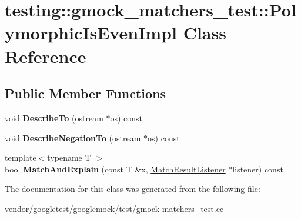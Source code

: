 \hypertarget{classtesting_1_1gmock__matchers__test_1_1_polymorphic_is_even_impl}{}\section{testing\+:\+:gmock\+\_\+matchers\+\_\+test\+:\+:Polymorphic\+Is\+Even\+Impl Class Reference}
\label{classtesting_1_1gmock__matchers__test_1_1_polymorphic_is_even_impl}
\subsection*{Public Member Functions}
\begin{DoxyCompactItemize}
\item 
\mbox{\label{classtesting_1_1gmock__matchers__test_1_1_polymorphic_is_even_impl_ac07eb9f72db98b4b5489a139e844394c}} 
void {\bfseries Describe\+To} (ostream $\ast$os) const
\item 
\mbox{\label{classtesting_1_1gmock__matchers__test_1_1_polymorphic_is_even_impl_a2e873630451f3cf6cad5bf6f82e00a33}} 
void {\bfseries Describe\+Negation\+To} (ostream $\ast$os) const
\item 
\mbox{\label{classtesting_1_1gmock__matchers__test_1_1_polymorphic_is_even_impl_ab8d500c4d6c57645527fc367acf6189e}} 
{\footnotesize template$<$typename T $>$ }\\bool {\bfseries Match\+And\+Explain} (const T \&x, \mbox{\hyperlink{classtesting_1_1_match_result_listener}{Match\+Result\+Listener}} $\ast$listener) const
\end{DoxyCompactItemize}


The documentation for this class was generated from the following file\+:\begin{DoxyCompactItemize}
\item 
vendor/googletest/googlemock/test/gmock-\/matchers\+\_\+test.\+cc\end{DoxyCompactItemize}
